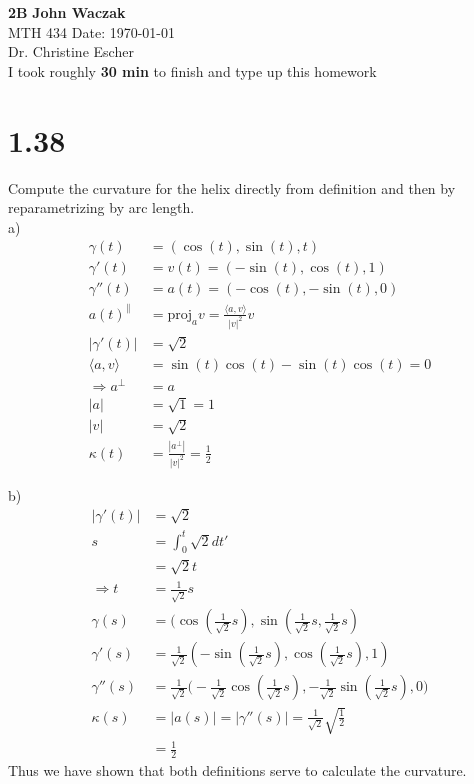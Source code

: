 \documentclass[a4paper, 11pt]{article}
\begin{document}
\noindent
\large\textbf{2B} \hfill \textbf{John Waczak} \\
\normalsize MTH 434 \hfill  Date: \today \\
Dr. Christine Escher \\
I took roughly \textbf{30 min} to finish and type up this homework\\ 
 
\section*{1.38}
Compute the curvature for the helix directly from definition and then by reparametrizing by arc length. \\

a) 
	\begin{align*}
		\gamma(t) &= (\cos(t), \sin(t), t) \\ 
		\gamma'(t)&= v(t) = (-\sin(t), \cos(t), 1)\\
		\gamma''(t)&= a(t) = (-\cos(t), -\sin(t), 0)\\
		a(t)^{\parallel} &= \text{proj}_av = \frac{\langle a, v \rangle}{|v|^2}v \\
		|\gamma'(t)| &= \sqrt{2} \\ 
		\langle a,v \rangle &= \sin(t)\cos(t)-\sin(t)\cos(t) = 0 \\ 
		\Rightarrow a^{\perp} &= a \\ 
		|a| &= \sqrt{1} = 1 \\ 
		|v| &= \sqrt{2} \\ 
		\kappa(t) &= \frac{|a^{\perp}|}{|v|^2} = \frac{1}{2} 
	\end{align*}

b) 
	\begin{align*}
		|\gamma'(t)| &= \sqrt{2} \\ 
		s &= \int_0^{t}\sqrt{2}dt' \\ 
			&= \sqrt{2}t \\ 
		\Rightarrow t &= \frac{1}{\sqrt{2}}s \\
		\gamma(s) &= (\cos(\frac{1}{\sqrt{2}}s), \sin(\frac{1}{\sqrt{2}}s, \frac{1}{\sqrt{2}}s)\\
		\gamma'(s) &= \frac{1}{\sqrt{2}}(-\sin(\frac{1}{\sqrt{2}}s), \cos(\frac{1}{\sqrt{2}}s), 1) \\ 
		\gamma''(s) &= \frac{1}{\sqrt{2}}\Big(-\frac{1}{\sqrt{2}}\cos(\frac{1}{\sqrt{2}}s), -\frac{1}{\sqrt{2}}\sin(\frac{1}{\sqrt{2}}s), 0\Big) \\ 
		\kappa(s) &= |a(s)| = |\gamma''(s)| = \frac{1}{\sqrt{2}}\sqrt{\frac{1}{2}}\\
			&= \frac{1}{2}
	\end{align*}
	Thus we have shown that both definitions serve to calculate the curvature. 
\end{document}
